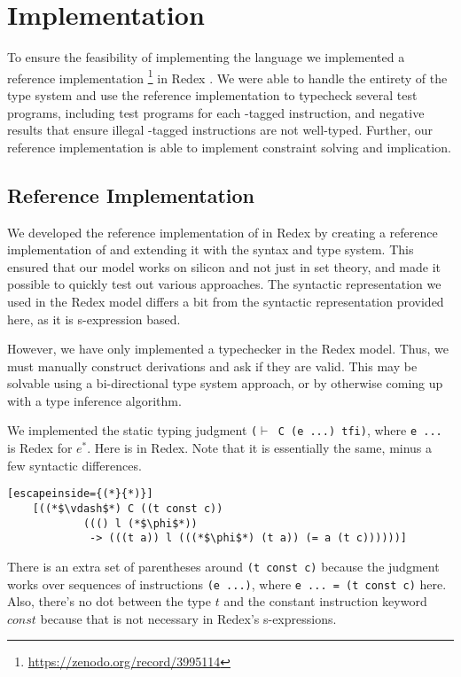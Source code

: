 \chapter{Implementation}
\label{chp:implementation}
To ensure the feasibility of implementing the \name language we implemented a reference implementation \footnote{\hyperlink{https://zenodo.org/record/3995114}{https://zenodo.org/record/3995114}} in Redex \cite{redex}.
We were able to handle the entirety of the type system and use the reference implementation to typecheck several test programs, including test programs for each \prechk-tagged instruction, and negative results that ensure illegal \prechk-tagged instructions are not well-typed.
Further, our reference implementation is able to implement constraint solving and implication.

\section{Reference Implementation}
We developed the reference implementation of \name in Redex by creating a reference implementation of \wasm and extending it with the \name syntax and type system.
This ensured that our model works on silicon and not just in set theory, and made it possible to quickly test out various approaches.
The syntactic representation we used in the Redex model differs a bit from the syntactic representation provided here, as it is s-expression based.

However, we have only implemented a typechecker in the Redex model.
Thus, we must manually construct derivations and ask if they are valid.
This may be solvable using a bi-directional type system approach, or by otherwise coming up with a type inference algorithm.

We implemented the static typing judgment \texttt{($\vdash$ C (e ...) tfi)}, where \texttt{e ...} is Redex for $e^{*}$.
Here is  in Redex.
Note that it is essentially the same, minus a few syntactic differences.

\begin{lstlisting}[escapeinside={(*}{*)}]
    [((*$\vdash$*) C ((t const c))
            ((() l (*$\phi$*))
             -> (((t a)) l (((*$\phi$*) (t a)) (= a (t c))))))]
\end{lstlisting}

There is an extra set of parentheses around \texttt{(t const c)} because the judgment works over sequences of instructions \texttt{(e ...)}, where \texttt{e ... = (t const c)} here.
Also, there's no dot between the type $t$ and the constant instruction keyword $const$ because that is not necessary in Redex's s-expressions.

